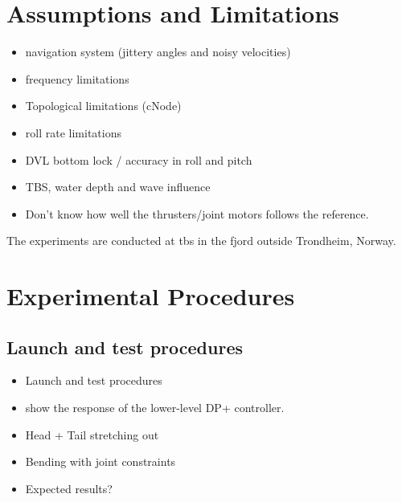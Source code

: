 
\section{Assumptions and Limitations}
\begin{itemize}
    \item navigation system (jittery angles and noisy velocities)
    \item frequency limitations
    \item Topological limitations (cNode)
    \item roll rate limitations
    \item DVL bottom lock / accuracy in roll and pitch
    \item TBS, water depth and wave influence
    \item Don't know how well the thrusters/joint motors follows the reference.
\end{itemize}

The experiments are conducted at \gls{tbs} in the fjord outside Trondheim, Norway.
\section{Experimental Procedures}
\subsection*{Launch and test procedures}
\begin{itemize}
    \item Launch and test procedures
    \item show the response of the lower-level DP+ controller.
    \item Head + Tail stretching out
    \item Bending with joint constraints
    \item Expected results?
\end{itemize}

